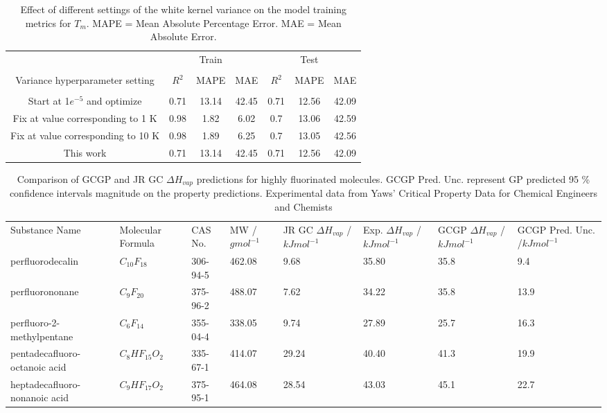 \documentclass[journal=jacsat,manuscript=article]{achemso}
\begin{document}
\begin{table}[H]
    \centering
    \begin{tabular}{ccccccc}
         &  &Train  &  &  &  Test& 
\\
\\
         Variance hyperparameter setting&  $R^2$ &  MAPE&  MAE&  $R^2$ &  MAPE& MAE
\\
\\
         Start at 1$e^{-5}$ and optimize&  0.71&  13.14&  42.45&  0.71&  12.56& 42.09
\\
         Fix at value corresponding to 1 K &  0.98&  1.82&  6.02&  0.7&  13.06& 42.59
\\
         Fix at value corresponding to 10 K &  0.98&  1.89&  6.25&  0.7&  13.05& 42.56
\\
         This work&  0.71&  13.14&  42.45&  0.71&  12.56& 42.09
\\
    \end{tabular}
    \caption{Effect of different settings of the white kernel variance on the model training metrics for $T_m$. MAPE = Mean Absolute Percentage Error. MAE = Mean Absolute Error.}
    \label{tab:white_kern_settings_and_Tm}
\end{table}



\begin{table}[H]
\centering
\begin{tabular}{p{2.9cm}p{1.8cm}p{1.6cm}p{1.5cm}p{1.6cm}p{1.6cm}p{1.6cm}p{1.6cm}} 
Substance Name&  Molecular Formula&  CAS No.&  MW /$gmol^{-1}$&  JR GC $\Delta H_{vap}$ /$kJmol^{-1}$&  Exp. $\Delta H_{vap}$ /$kJmol^{-1}$&  GCGP $\Delta H_{vap}$ /$kJmol^{-1}$& GCGP Pred. Unc. /$kJmol^{-1}$ 


\\
         perfluorodecalin&  $C_{10}F_{18}$&  306-94-5&  462.08&  9.68&  35.80&  35.8& 9.4
\\
         perfluorononane&  $C_{9}F_{20}$&  375-96-2&  488.07&  7.62&  34.22&  35.8& 13.9
\\
         perfluoro-2-methylpentane&  $C_{6}F_{14}$&  355-04-4&  338.05&  9.74&  27.89&  25.7& 16.3
\\
         pentadecafluoro-octanoic acid&  $C_{8}HF_{15}O_{2}$&  335-67-1&  414.07&  29.24&  40.40&  41.3& 19.9
\\
         heptadecafluoro-nonanoic acid&  $C_{9}HF_{17}O_{2}$&  375-95-1&  464.08&  28.54&  43.03&  45.1& 22.7
\\
\end{tabular}
\caption{Comparison of GCGP and JR GC $\Delta H_{vap}$ predictions for highly fluorinated molecules. GCGP Pred. Unc. represent GP predicted 95 \% confidence intervals magnitude on the property predictions. Experimental data from Yaws' Critical Property Data for Chemical Engineers and Chemists \cite{yaws-critical-property}}
\label{tab:Hvap_pred_fluorinated_mols}
\end{table}
\end{document}
